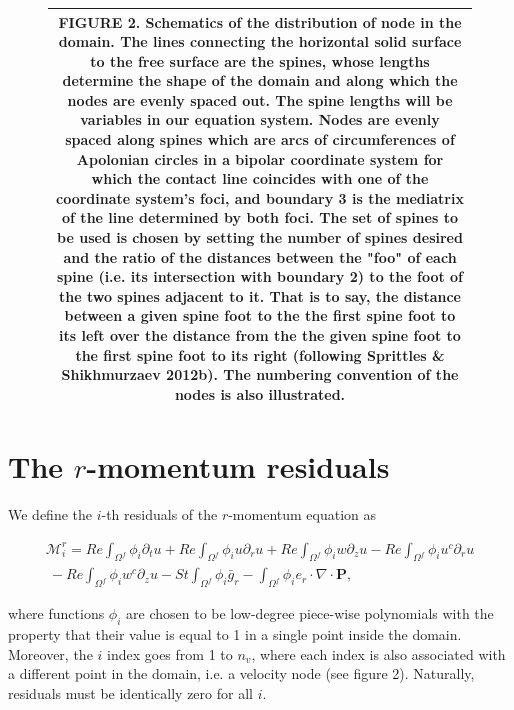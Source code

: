 \documentclass{article}
\begin{document}
\begin{figure}[h]
\centering
\begin{tabular}{|c|}
\hline
FIGURE 2. Schematics of the distribution of node in the domain. The lines connecting the horizontal solid surface to the free surface are the spines, whose lengths determine the shape of the domain and along which the nodes are evenly spaced out. The spine lengths will be variables in our equation system. Nodes are evenly spaced along spines which are arcs of circumferences of Apolonian circles in a bipolar coordinate system for which the contact line coincides with one of the coordinate system's foci, and boundary 3 is the mediatrix of the line determined by both foci. The set of spines to be used is chosen by setting the number of spines desired and the ratio of the distances between the "foo" of each spine (i.e. its intersection with boundary 2) to the foot of the two spines adjacent to it. That is to say, the distance between a given spine foot to the the first spine foot to its left over the distance from the the given spine foot to the first spine foot to its right (following Sprittles \& Shikhmurzaev 2012b). The numbering convention of the nodes is also illustrated. \\
\hline
\end{tabular}
\end{figure}

\section{The \(r\)-momentum residuals}

We define the \(i\)-th residuals of the \(r\)-momentum equation as

\begin{equation}
\begin{array}{l}{\mathcal{M}_{i}^{r} = Re\int_{\Omega^{f}}\phi_{i}\partial_{t}u + Re\int_{\Omega^{f}}\phi_{i}u\partial_{r}u + Re\int_{\Omega^{f}}\phi_{i}w\partial_{z}u - Re\int_{\Omega^{f}}\phi_{i}u^{c}\partial_{r}u}\\ {~ - Re\int_{\Omega^{f}}\phi_{i}w^{c}\partial_{z}u - St\int_{\Omega^{f}}\phi_{i}\bar{g}_{r} - \int_{\Omega^{f}}\phi_{i}e_{r}\cdot \nabla \cdot \pmb {P},} \end{array} \tag{4.1}
\end{equation}

where functions \(\phi_{i}\) are chosen to be low-degree piece-wise polynomials with the property that their value is equal to 1 in a single point inside the domain. Moreover, the \(i\) index goes from 1 to \(n_{v}\), where each index is also associated with a different point in the domain, i.e. a velocity node (see figure 2). Naturally, residuals must be identically zero for all \(i\).
\end{document}
